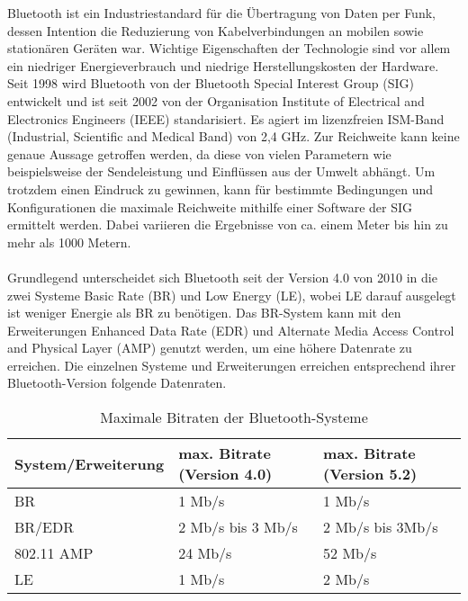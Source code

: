 Bluetooth ist ein Industriestandard für die Übertragung von Daten per Funk, dessen Intention die Reduzierung von Kabelverbindungen an mobilen sowie stationären Geräten war. Wichtige Eigenschaften der Technologie sind vor allem ein niedriger Energieverbrauch und niedrige Herstellungskosten der Hardware. Seit 1998 wird Bluetooth von der Bluetooth Special Interest Group (SIG) entwickelt und ist seit 2002 von der Organisation Institute of Electrical and Electronics Engineers (IEEE) standarisiert.
Es agiert im lizenzfreien ISM-Band (Industrial, Scientific and Medical Band) von 2,4 GHz.
Zur Reichweite kann keine genaue Aussage getroffen werden, da diese von vielen Parametern wie beispielsweise der Sendeleistung und Einflüssen aus der Umwelt abhängt. Um trotzdem einen Eindruck zu gewinnen, kann für bestimmte Bedingungen und Konfigurationen die maximale Reichweite mithilfe einer Software der SIG ermittelt werden. Dabei variieren die Ergebnisse von ca. einem Meter bis hin zu mehr als 1000 Metern.
\\\\
Grundlegend unterscheidet sich Bluetooth seit der Version 4.0 von 2010 in die zwei Systeme Basic Rate (BR) und Low Energy (LE), wobei LE darauf ausgelegt ist weniger Energie als BR zu benötigen. Das BR-System kann mit den Erweiterungen Enhanced Data Rate (EDR) und Alternate Media Access Control and Physical Layer (AMP) genutzt werden, um eine höhere Datenrate zu erreichen. Die einzelnen Systeme und Erweiterungen erreichen entsprechend ihrer Bluetooth-Version folgende Datenraten.\\

\begin{table}
    \caption{Maximale Bitraten der Bluetooth-Systeme}
    \begin{tabular}[h]{l|l|l}
    System/Erweiterung & max. Bitrate (Version 4.0) & max. Bitrate (Version 5.2) \\
    \hline
    BR & 1 Mb/s & 1 Mb/s \\
    BR/EDR & 2 Mb/s bis 3 Mb/s & 2 Mb/s bis 3Mb/s \\
    802.11 AMP & 24 Mb/s & 52 Mb/s \\
    LE & 1 Mb/s & 2 Mb/s \\
    \end{tabular}
\end{table}

